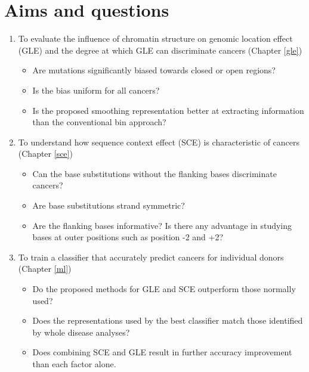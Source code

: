 \section{Aims and questions}
\label{intro:aims}
\begin{enumerate}
    \item To evaluate the influence of chromatin structure on genomic location effect (GLE) and the degree at which GLE can discriminate cancers (Chapter \ref{gle})
    \begin{itemize}
        \item Are mutations significantly biased towards closed or open regions?
        \item Is the bias uniform for all cancers?
        \item Is the proposed smoothing representation better at extracting information than the conventional bin approach?
    \end{itemize}
    \item To understand how sequence context effect (SCE) is characteristic of cancers (Chapter \ref{sce})
    \begin{itemize}
        \item Can the base substitutions without the flanking bases discriminate cancers?
        \item Are base substitutions strand symmetric?
        \item Are the flanking bases informative? Is there any advantage in studying bases at outer positions such as position -2 and +2?
    \end{itemize}
    \item To train a classifier that accurately predict cancers for individual donors (Chapter \ref{ml})
    \begin{itemize}
        \item Do the proposed methods for GLE and SCE outperform those normally used?
        \item Does the representations used by the best classifier match those identified by whole disease analyses?
        \item Does combining SCE and GLE result in further accuracy improvement than each factor alone.
    \end{itemize}
\end{enumerate}


